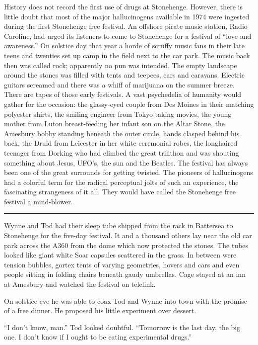 History does not record the first use of drugs at Stonehenge. However, there is little doubt that most of the major hallucinogens available in 1974 were ingested during the first Stonehenge free festival. An offshore pirate music station, Radio Caroline, had urged its listeners to come to Stonehenge for a festival of ``love and awareness.'' On solstice day that year a horde of scruffy music fans in their late teens and twenties set up camp in the field next to the car park. The music back then was called rock; apparently no pun was intended. The empty landscape around the stones was filled with tents and teepees, cars and caravans. Electric guitars screamed and there was a whiff of marijuana on the summer breeze. There are tapes of those early festivals. A vast psychedelia of humanity would gather for the occasion: the glassy-eyed couple from Des Moines in their matching polyester shirts, the smiling engineer from Tokyo taking movies, the young mother from Luton breast-feeding her infant son on the Altar Stone, the Amesbury bobby standing beneath the outer circle, hands clasped behind his back, the Druid from Leicester in her white ceremonial robes, the longhaired teenager from Dorking who had climbed the great trilithon and was shouting something about Jesus, UFO's, the sun and the Beatles. The festival has always been one of the great surrounds for getting twisted. The pioneers of hallucinogens had a colorful term for the radical perceptual jolts of such an experience, the fascinating strangeness of it all. They would have called the Stonehenge free festival a mind-blower.

\fancybreak{* * *}

Wynne and Tod had their sleep tube shipped from the rack in Battersea to Stonehenge for the five-day festival. It and a thousand others lay near the old car park across the A360 from the dome which now protected the stones. The tubes looked like giant white Soar capsules scattered in the grass. In between were tension bubbles, gortex tents of varying geometries, hovers and cars and even people sitting in folding chairs beneath gaudy umbrellas. Cage stayed at an inn at Amesbury and watched the festival on telelink.

On solstice eve he was able to coax Tod and Wynne into town with the promise of a free dinner. He proposed his little experiment over dessert.

``I don't know, man.'' Tod looked doubtful. ``Tomorrow is the last day, the big one. I don't know if I ought to be eating experimental drugs.''

